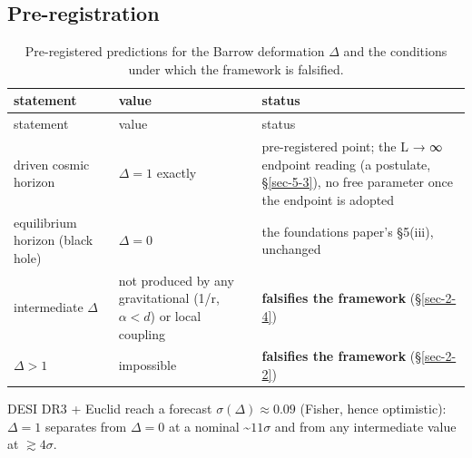 \documentclass[12pt]{iopart}
\begin{document}
\subsection{Pre-registration}\label{sec-5-5}

\begin{longtable}[]{@{}
  >{\raggedright\arraybackslash}p{}
  >{\raggedright\arraybackslash}p{}
  >{\raggedright\arraybackslash}p{}@{}}
\caption{Pre-registered predictions for the Barrow deformation
\(\Delta\) and the conditions under which the framework is
falsified.}\tabularnewline
\toprule\noalign{}
\begin{minipage}[b]{\linewidth}\raggedright
statement
\end{minipage} & \begin{minipage}[b]{\linewidth}\raggedright
value
\end{minipage} & \begin{minipage}[b]{\linewidth}\raggedright
status
\end{minipage} \\
\midrule\noalign{}
\endfirsthead
\toprule\noalign{}
\begin{minipage}[b]{\linewidth}\raggedright
statement
\end{minipage} & \begin{minipage}[b]{\linewidth}\raggedright
value
\end{minipage} & \begin{minipage}[b]{\linewidth}\raggedright
status
\end{minipage} \\
\midrule\noalign{}
\endhead
\bottomrule\noalign{}
\endlastfoot
driven cosmic horizon & \(\Delta  = 1\) exactly & pre-registered point;
the L → ∞ endpoint reading (a postulate, §\ref{sec-5-3}), no free
parameter once the endpoint is adopted \\
equilibrium horizon (black hole) & \(\Delta  = 0\) & the foundations
paper's §5(iii), unchanged \\
intermediate \(\Delta\) & not produced by any gravitational (1/r,
\(\alpha <d\)) or local coupling & \textbf{falsifies the framework}
(§\ref{sec-2-4}) \\
\(\Delta  > 1\) & impossible & \textbf{falsifies the framework}
(§\ref{sec-2-2}) \\
\end{longtable}

DESI DR3 + Euclid reach a forecast \(\sigma (\Delta ) \approx  0.09\)
(Fisher, hence optimistic): \(\Delta  = 1\) separates from
\(\Delta  = 0\) at a nominal \textasciitilde{}\(11\sigma\) and from any
intermediate value at \(\gtrsim  4\sigma\).
\end{document}
